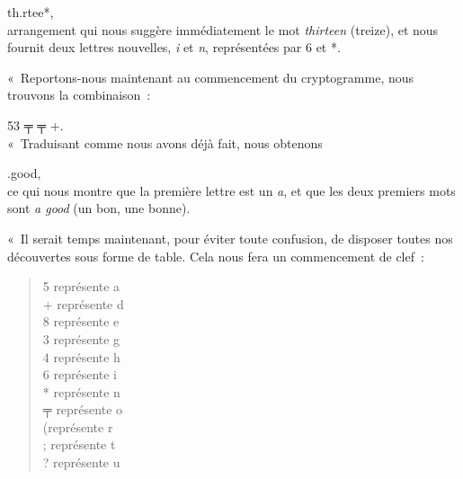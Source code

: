 \documentclass[french,twoside]{book} %
\begin{document}
th.rtee*,\\

\noindent arrangement qui nous suggère immédiatement le mot \emph{thirteen} (treize), et nous fournit deux lettres nouvelles, \emph{i} et \emph{n}, représentées par 6 et *.\par
« Reportons-nous maintenant au commencement du cryptogramme, nous trouvons la combinaison :\par

53 ╤ ╤ +.\\

\noindent « Traduisant comme nous avons déjà fait, nous obtenons\par

.good,\\

\noindent ce qui nous montre que la première lettre est un \emph{a}, et que les deux premiers mots sont \emph{a good} (un bon, une bonne).\par
« Il serait temps maintenant, pour éviter toute confusion, de disposer toutes nos découvertes sous forme de table. Cela nous fera un commencement de clef :\par


\begin{verse}
5 représente a\\
+ représente d\\
8 représente e\\
3 représente g\\
4 représente h\\
6 représente i\\
* représente n\\
╤ représente o\\
(représente r\\
; représente t\\
? représente u\\
\end{verse}
\end{document}
